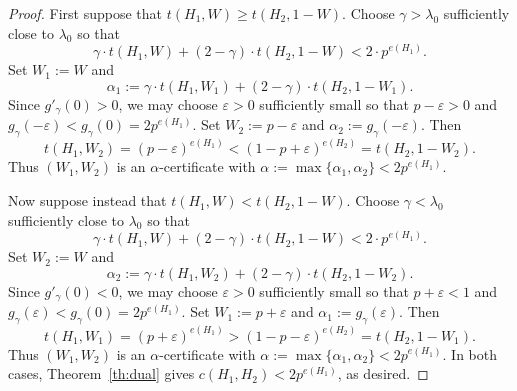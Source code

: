 \documentclass[10pt,a4paper]{amsart}
\begin{document}
\begin{proof}
First suppose that $t(H_1,W)\geq t(H_2,1-W)$. Choose $\gamma>\lambda_0$ sufficiently close to $\lambda_0$ so that
\[
\gamma\cdot t(H_1,W)+(2-\gamma)\cdot t(H_2,1-W)<2\cdot p^{e(H_1)}.
\]
Set $W_1:=W$ and
\[
\alpha_1:=\gamma\cdot t(H_1,W_1)+(2-\gamma)\cdot t(H_2,1-W_1).
\]
Since $g'_\gamma(0)>0$, we may choose $\varepsilon>0$ sufficiently small so that $p-\varepsilon>0$ and $
g_\gamma(-\varepsilon)<g_\gamma(0)=2p^{e(H_1)}$. Set $W_2:=p-\varepsilon$ and $\alpha_2:=g_\gamma(-\varepsilon)$. Then
\[
t(H_1,W_2)=(p-\varepsilon)^{e(H_1)}<(1-p+\varepsilon)^{e(H_2)}=t(H_2,1-W_2).
\]
Thus $(W_1,W_2)$ is an $\alpha$-certificate with $\alpha:=\max\{\alpha_1,\alpha_2\}<2p^{e(H_1)}$. 

Now suppose instead that $t(H_1,W)<t(H_2,1-W)$. Choose $\gamma<\lambda_0$ sufficiently close to $\lambda_0$ so that
\[
\gamma\cdot t(H_1,W)+(2-\gamma)\cdot t(H_2,1-W)<2\cdot p^{e(H_1)}.
\]
Set $W_2:=W$ and
\[
\alpha_2:=\gamma\cdot t(H_1,W_2)+(2-\gamma)\cdot t(H_2,1-W_2).
\]
Since $g'_\gamma(0)<0$, we may choose $\varepsilon>0$ sufficiently small so that $p+\varepsilon<1$ and $g_\gamma(\varepsilon)<g_\gamma(0)=2p^{e(H_1)}$. Set $W_1:=p+\varepsilon$ and $\alpha_1:=g_\gamma(\varepsilon)$. Then
\[
t(H_1,W_1)=(p+\varepsilon)^{e(H_1)}>(1-p-\varepsilon)^{e(H_2)}=t(H_2,1-W_1).
\]
Thus $(W_1,W_2)$ is an $\alpha$-certificate with $\alpha:=\max\{\alpha_1,\alpha_2\}<2p^{e(H_1)}$. In both cases, Theorem~\ref{th:dual} gives $c(H_1,H_2)<2p^{e(H_1)}$, as desired.
\end{proof}
\end{document}
